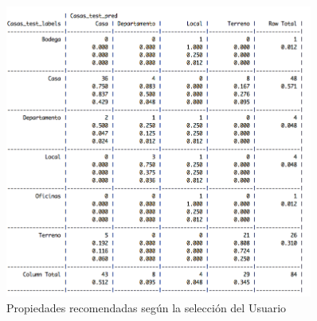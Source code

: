 

\begin{figure}[h]
\centering
\includegraphics[width=0.9\textwidth]{ModeloPredictivo.png}
\caption{Propiedades recomendadas según la selección del Usuario}
\end{figure}
